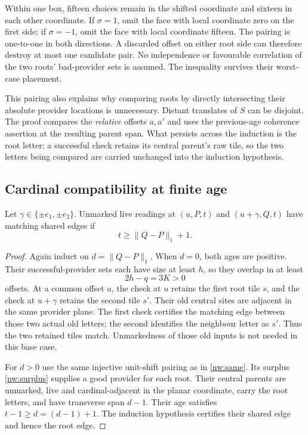 Within one box, fifteen choices remain in the shifted coordinate and sixteen in each other coordinate. If $\sigma=1$, omit the face with local coordinate zero on the first side; if $\sigma=-1$, omit the face with local coordinate fifteen. The pairing is one-to-one in both directions. A discarded offset on either root side can therefore destroy at most one candidate pair. No independence or favourable correlation of the two roots' bad-provider sets is assumed. The inequality survives their worst-case placement.

This pairing also explains why comparing roots by directly intersecting their absolute provider locations is unnecessary. Distant translates of $S$ can be disjoint. The proof compares the \emph{relative} offsets $a,a'$ and uses the previous-age coherence assertion at the resulting parent span. What persists across the induction is the root letter: a successful check retains its central parent's raw tile, so the two letters being compared are carried unchanged into the induction hypothesis.
\subsection{Cardinal compatibility at finite age}

\begin{lemma}\label{nw:neighbours}
Let $\gamma\in\{\pm e_1,\pm e_2\}$. Unmarked live readings at $(u,P,t)$ and $(u+\gamma,Q,t)$ have matching shared edges if
\[
 t\ge\|Q-P\|_1+1.
\]
\end{lemma}
\begin{proof}
Again induct on $d=\|Q-P\|_1$. When $d=0$, both ages are positive. Their successful-provider sets each have size at least $h$, so they overlap in at least
\[
 2h-q=3K>0
\]
offsets. At a common offset $a$, the check at $u$ retains the first root tile $s$, and the check at $u+\gamma$ retains the second tile $s'$. Their old central sites are adjacent in the same provider plane. The first check certifies the matching edge between those two actual old letters; the second identifies the neighbour letter as $s'$. Thus the two retained tiles match. Unmarkedness of those old inputs is not needed in this base case.

For $d>0$ use the same injective unit-shift pairing as in \cref{nw:same}. Its surplus \eqref{nw:surplus} supplies a good provider for each root. Their central parents are unmarked, live and cardinal-adjacent in the planar coordinate, carry the root letters, and have transverse span $d-1$. Their age satisfies $t-1\ge d=(d-1)+1$. The induction hypothesis certifies their shared edge and hence the root edge.
\end{proof}

